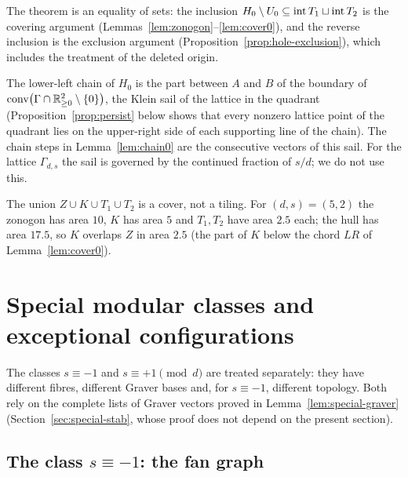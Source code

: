 \begin{remark}
The theorem is an equality of sets: the inclusion $H_0\setminus U_0\subseteq\operatorname{int} T_1\sqcup\operatorname{int} T_2$ is the covering argument (Lemmas~\ref{lem:zonogon}--\ref{lem:cover0}), and the reverse inclusion is the exclusion argument (Proposition~\ref{prop:hole-exclusion}), which includes the treatment of the deleted origin.
\end{remark}

\begin{remark}
The lower-left chain of $H_0$ is the part between $A$ and $B$ of the boundary of $\operatorname{conv}\bigl(\Gamma\cap\mathbb R_{\ge0}^2\setminus\{0\}\bigr)$, the Klein sail of the lattice in the quadrant (Proposition~\ref{prop:persist} below shows that every nonzero lattice point of the quadrant lies on the upper-right side of each supporting line of the chain). The chain steps in Lemma~\ref{lem:chain0} are the consecutive vectors of this sail. For the lattice $\Gamma_{d,s}$ the sail is governed by the continued fraction of $s/d$; we do not use this.
\end{remark}

\begin{remark}
The union $Z\cup K\cup T_1\cup T_2$ is a cover, not a tiling. For $(d,s)=(5,2)$ the zonogon has area $10$, $K$ has area $5$ and $T_1,T_2$ have area $2.5$ each; the hull has area $17.5$, so $K$ overlaps $Z$ in area $2.5$ (the part of $K$ below the chord $LR$ of Lemma~\ref{lem:cover0}).
\end{remark}

\section{Special modular classes and exceptional configurations}\label{sec:special-classes}

The classes $s\equiv-1$ and $s\equiv+1\pmod d$ are treated separately: they have different fibres, different Graver bases and, for $s\equiv-1$, different topology. Both rely on the complete lists of Graver vectors proved in Lemma~\ref{lem:special-graver} (Section~\ref{sec:special-stab}, whose proof does not depend on the present section).

\subsection{\texorpdfstring{The class $s\equiv-1$: the fan graph}{The class s = -1: the fan graph}}

